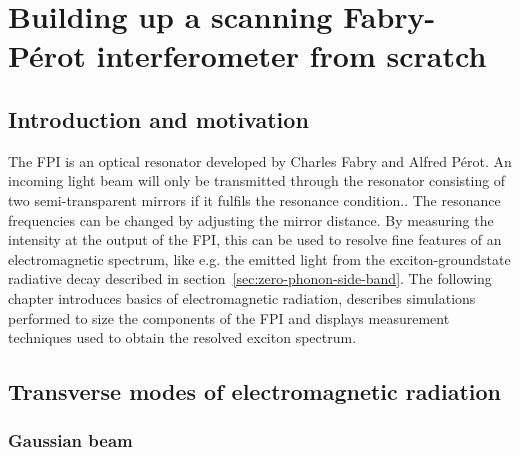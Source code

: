 \chapter{Building up a scanning Fabry-Pérot interferometer from scratch}
\label{chapter:scanning-fabry-perot}
\section{Introduction and motivation}

The \ac{FPI} is an optical resonator developed by Charles Fabry and Alfred Pérot.
An incoming light beam will only be transmitted through the resonator consisting of two semi-transparent mirrors if it fulfils the resonance condition.\cite{kaldewey_coherent_2017}.
The resonance frequencies can be changed by adjusting the mirror distance.
By measuring the intensity at the output of the \ac{FPI}, this can be used to resolve fine features of an electromagnetic spectrum, like e.g. the emitted light from the exciton-groundstate radiative decay described in section~\ref{sec:zero-phonon-side-band}.
The following chapter introduces basics of electromagnetic radiation, describes simulations performed to size the components of the \ac{FPI} and displays measurement techniques used to obtain the resolved exciton spectrum.

\section{Transverse modes of electromagnetic radiation}


\subsection{Gaussian beam}
\label{subsec:gaussian-beam}

